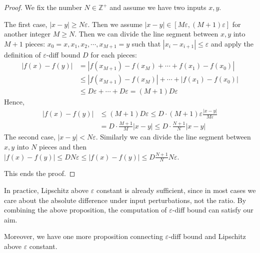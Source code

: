 \documentclass{llncs}
\begin{document}
	\begin{proof} We fix the number $N\in\mathbb{Z}^+$ and assume we have two inputs $x, y$.
		
		The first case, $|x-y|\geq N\varepsilon$. Then we assume $|x-y| \in [M\varepsilon ,  (M+1)\varepsilon]$ for another integer $M\geq N$. Then we can divide the line segment between $x, y$ into $M+1$ pieces: $x_0 = x, x_1, x_2, \cdots, x_{M+1} = y$ such that $|x_i-x_{i+1}| \leq \varepsilon$ and apply the definition of $\varepsilon$-diff bound $D$ for each pieces:\begin{align*}
			|f(x)-f(y)| &= |f(x_{M+1})-f(x_M)+\cdots+f(x_1)-f(x_0)|\\
			&\leq |f(x_{M+1})-f(x_M)|+\cdots+|f(x_1)-f(x_0)|\\
			&\leq D\varepsilon + \cdots +D\varepsilon = (M+1)D\varepsilon
		\end{align*}
		Hence,\begin{align*}
			|f(x)-f(y)| &\leq (M+1)D\varepsilon \leq D\cdot (M+1)\varepsilon \frac{|x-y|}{M\varepsilon}\\
			&= D\cdot\frac{M+1}{M} |x-y|	\leq   D\cdot\frac{N+1}{N} |x-y|		
		\end{align*}
		The second case, $|x-y|< N\varepsilon$. Similarly we can divide the line segment between $x, y$ into $N$ pieces and then $|f(x)-f(y)|\leq D N\varepsilon\leq |f(x)-f(y)|\leq D \frac{N+1}{N} N\varepsilon$.
		
		This ends the proof.
	\end{proof}

	In practice, Lipschitz above $\varepsilon$ constant is already sufficient, since in most cases we care about the absolute difference under input perturbations, not the ratio. By combining the above proposition, the computation of $\varepsilon$-diff bound can satisfy our aim.
	

	Moreover, we have one more proposition connecting $\varepsilon$-diff bound and Lipschitz above $\varepsilon$ constant.
	
\end{document}
